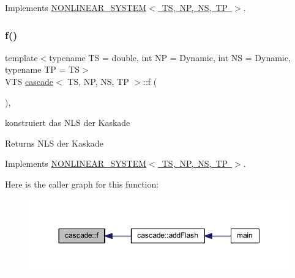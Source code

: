 Implements \mbox{\hyperlink{class_n_o_n_l_i_n_e_a_r___s_y_s_t_e_m_a531f56bcbc77f2219164af40aa16fad2}{N\+O\+N\+L\+I\+N\+E\+A\+R\+\_\+\+S\+Y\+S\+T\+E\+M$<$ T\+S, N\+P, N\+S, T\+P $>$}}.

\mbox{\label{classcascade_a9c5bb14ea8b17d1f79c097c6704f1919}} 
\subsubsection{\texorpdfstring{f()}{f()}}
{\footnotesize\ttfamily template$<$typename TS = double, int NP = Dynamic, int NS = Dynamic, typename TP = TS$>$ \\
V\+TS \mbox{\hyperlink{classcascade}{cascade}}$<$ TS, NP, NS, TP $>$\+::f (\begin{DoxyParamCaption}{ }\end{DoxyParamCaption})\hspace{0.3cm}{\ttfamily [inline]}, {\ttfamily [virtual]}}



konstruiert das N\+LS der Kaskade 

\begin{DoxyReturn}{Returns}
N\+LS der Kaskade 
\end{DoxyReturn}


Implements \mbox{\hyperlink{class_n_o_n_l_i_n_e_a_r___s_y_s_t_e_m_a65827d7df297f26cd3f14f472a212077}{N\+O\+N\+L\+I\+N\+E\+A\+R\+\_\+\+S\+Y\+S\+T\+E\+M$<$ T\+S, N\+P, N\+S, T\+P $>$}}.

Here is the caller graph for this function\+:\nopagebreak
\begin{figure}[H]
\begin{center}
\leavevmode
\includegraphics[width=350pt]{classcascade_a9c5bb14ea8b17d1f79c097c6704f1919_icgraph}
\end{center}
\end{figure}
\mbox{\label{classcascade_a1608f0fc7e55bd87b4fc1a109ded71fa}} 
